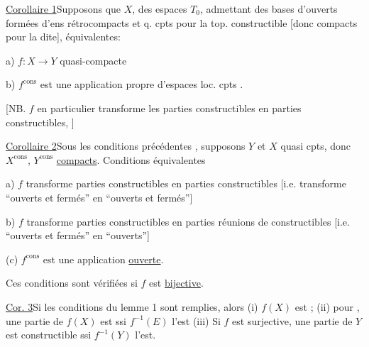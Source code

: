 \uline{Corollaire 1}\quad Supposons que $X$,    des espaces $T_0$,  admettant des bases d'ouverts formées d'ens  rétrocompacts et q. cpts pour la top. constructible [donc compacts pour la dite],   équivalentes:

a) $f:X\longrightarrow Y$    quasi-compacte

\deleted{[\unsure{si} cpt $X$}\quad {} b) $f^{\mathrm{cons}}$ est une  application propre d'espaces loc. cpts .



[NB. $f$ en particulier transforme les parties constructibles en parties constructibles, ]

\uline{Corollaire 2}\quad Sous les conditions précédentes , supposons $Y$ et $X$ quasi cpts, donc $X^{\mathrm{cons}}$, $Y^{\mathrm{cons}}$ \uline{compacts}. Conditions équivalentes

a) $f$ transforme parties constructibles en parties constructibles [i.e. transforme ``ouverts et fermés'' en ``ouverts et fermés'']

b) $f$ transforme parties constructibles en parties réunions de constructibles [i.e. ``ouverts et fermés'' en ``ouverts'']

(c) $f^{\mathrm{cons}}$ est une application \uline{ouverte}. 

Ces conditions sont vérifiées si $f$ est \uline{bijective}.

\uline{Cor. 3}\quad Si les conditions du lemme 1 sont remplies, alors (i) $f(X)$ est ; (ii) pour , une partie  de $f(X)$ est  ssi $f^{-1}(E)$ l'est (iii) Si $f$ est surjective, une partie de $Y$ est constructible ssi $f^{-1}(Y)$ l'est.

